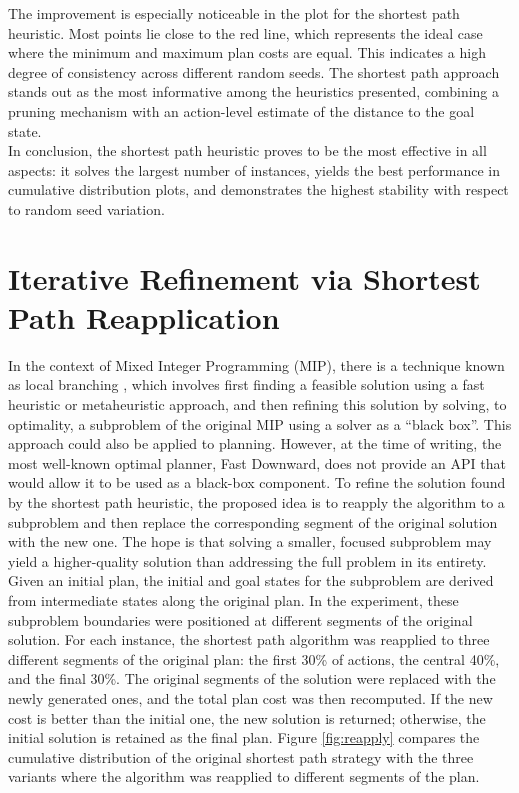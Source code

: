 The improvement is especially noticeable in the plot for the shortest path heuristic. Most points lie close to the red line,
which represents the ideal case where the minimum and maximum plan costs are equal. This indicates a high degree of consistency
across different random seeds. The shortest path approach stands out as the most informative among the heuristics presented,
combining a pruning mechanism with an action-level estimate of the distance to the goal state.\\
In conclusion, the shortest path heuristic proves to be the most effective in all aspects: it solves the largest number of instances,
yields the best performance in cumulative distribution plots, and demonstrates the highest stability with respect to random seed variation.

\section{Iterative Refinement via Shortest Path Reapplication}
In the context of Mixed Integer Programming (MIP), there is a technique known as local branching \cite{fischetti2003local},
which involves first finding a feasible solution using a fast heuristic or metaheuristic approach, and then refining this solution by solving,
to optimality, a subproblem of the original MIP using a solver as a ``black box''.
This approach could also be applied to planning. However, at the time of writing, the most well-known optimal planner, Fast Downward,
does not provide an API that would allow it to be used as a black-box component. To refine the solution found by the shortest path heuristic,
the proposed idea is to reapply the algorithm to a subproblem and then replace the corresponding segment of the original solution with the new one.
The hope is that solving a smaller, focused subproblem may yield a higher-quality solution than addressing the full problem in its entirety.
Given an initial plan, the initial and goal states for the subproblem are derived from intermediate states along the original plan.
In the experiment, these subproblem boundaries were positioned at different segments of the original solution.
For each instance, the shortest path algorithm was reapplied to three different segments of the original plan: the first 30\% of actions,
the central 40\%, and the final 30\%.
The original segments of the solution were replaced with the newly generated ones, and the total plan cost was then recomputed.
If the new cost is better than the initial one, the new solution is returned; otherwise, the initial solution is retained as the final plan.
Figure \ref{fig:reapply} compares the cumulative distribution of the original shortest path
strategy with the three variants where the algorithm was reapplied to different segments of the plan.

